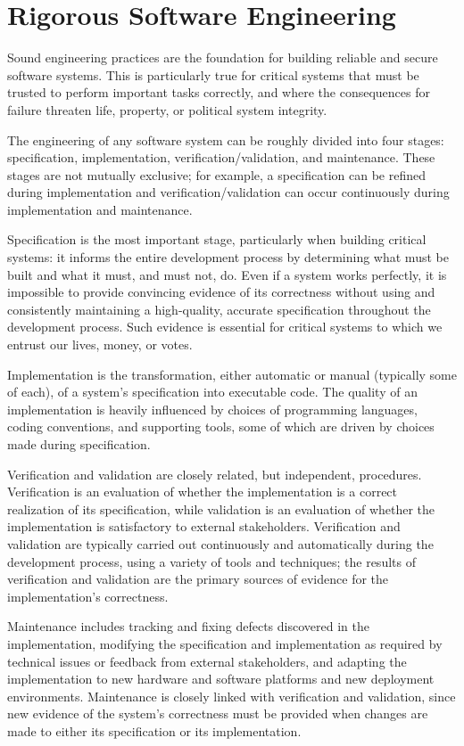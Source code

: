 \chapter{Rigorous Software Engineering}
\label{cha:rigor-softw-engin}

Sound engineering practices are the foundation for building reliable
and secure software systems. This is particularly true for critical
systems that must be trusted to perform important tasks correctly, and
where the consequences for failure threaten life, property, or
political system integrity.

The engineering of any software system can be roughly divided into
four stages: specification, implementation, verification/validation,
and maintenance. These stages are not mutually exclusive; for example,
a specification can be refined during implementation and
verification/validation can occur continuously during implementation
and maintenance.

Specification is the most important stage, particularly when building
critical systems: it informs the entire development process by
determining what must be built and what it must, and must not,
do. Even if a system works perfectly, it is impossible to provide
convincing evidence of its correctness without using and consistently
maintaining a high-quality, accurate specification throughout the
development process. Such evidence is essential for critical systems
to which we entrust our lives, money, or votes.

Implementation is the transformation, either automatic or manual
(typically some of each), of a system's specification into executable
code. The quality of an implementation is heavily influenced by
choices of programming languages, coding conventions, and supporting
tools, some of which are driven by choices made during specification.

Verification and validation are closely related, but independent,
procedures. Verification is an evaluation of whether the
implementation is a correct realization of its specification, while
validation is an evaluation of whether the implementation is
satisfactory to external stakeholders. Verification and validation are
typically carried out continuously and automatically during the
development process, using a variety of tools and techniques; the
results of verification and validation are the primary sources of
evidence for the implementation's correctness.

Maintenance includes tracking and fixing defects discovered in the
implementation, modifying the specification and implementation as
required by technical issues or feedback from external stakeholders,
and adapting the implementation to new hardware and software platforms
and new deployment environments. Maintenance is closely linked with
verification and validation, since new evidence of the system's
correctness must be provided when changes are made to either its
specification or its implementation.

